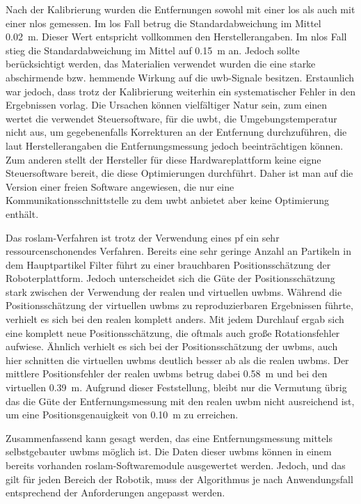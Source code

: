 Nach der Kalibrierung wurden die Entfernungen sowohl mit einer \gls{los} als auch mit einer \gls{nlos} gemessen. Im \gls{los} Fall betrug die Standardabweichung im Mittel \SI{0.02}{\meter}. Dieser Wert entspricht vollkommen den Herstellerangaben. Im \gls{nlos} Fall stieg die Standardabweichung im Mittel auf \SI{0.15}{\meter} an. Jedoch sollte berücksichtigt werden, das Materialien verwendet wurden die eine starke abschirmende bzw. hemmende Wirkung auf die \gls{uwb}-Signale besitzen. Erstaunlich war jedoch, dass trotz der Kalibrierung weiterhin ein systematischer Fehler in den Ergebnissen vorlag. Die Ursachen können vielfältiger Natur sein, zum einen wertet die verwendet Steuersoftware, für die \gls{uwbt}, die Umgebungstemperatur nicht aus, um gegebenenfalls Korrekturen an der Entfernung durchzuführen, die laut Herstellerangaben die Entfernungsmessung jedoch beeinträchtigen können. Zum anderen stellt der Hersteller für diese Hardwareplattform keine eigne Steuersoftware bereit, die diese Optimierungen durchführt. Daher ist man auf die Version einer freien Software angewiesen, die nur eine Kommunikationsschnittstelle zu dem \gls{uwbt} anbietet aber keine Optimierung enthält.

Das \gls{roslam}-Verfahren ist trotz der Verwendung eines \gls{pf} ein sehr ressourcenschonendes Verfahren. Bereits eine sehr geringe Anzahl an Partikeln in dem Hauptpartikel Filter führt zu einer brauchbaren Positionsschätzung der Roboterplattform. Jedoch unterscheidet sich die Güte der Positionsschätzung stark zwischen der Verwendung der realen und virtuellen \glspl{uwbm}. Während die Positionsschätzung der virtuellen \glspl{uwbm} zu reproduzierbaren Ergebnissen führte, verhielt es sich bei den realen  komplett anders. Mit jedem Durchlauf ergab sich eine komplett neue Positionsschätzung, die oftmals auch große Rotationsfehler aufwiese. Ähnlich verhielt es sich bei der Positionsschätzung der \glspl{uwbm}, auch hier schnitten die virtuellen \glspl{uwbm} deutlich besser ab als die realen \glspl{uwbm}. Der mittlere Positionsfehler der realen \glspl{uwbm} betrug dabei \SI{0.58}{\meter} und bei den virtuellen \SI{0.39}{\meter}. Aufgrund dieser Feststellung, bleibt nur die Vermutung übrig das die Güte der Entfernungsmessung mit den realen \gls{uwbm} nicht ausreichend ist, um eine Positionsgenauigkeit von \SI{0.10}{\meter} zu erreichen.

Zusammenfassend kann gesagt werden, das eine Entfernungsmessung mittels selbstgebauter \glspl{uwbm} möglich ist. Die Daten dieser \glspl{uwbm} können in einem bereits vorhanden \gls{roslam}-Softwaremodule ausgewertet werden. Jedoch, und das gilt für jeden Bereich der Robotik, muss der Algorithmus je nach Anwendungsfall entsprechend der Anforderungen angepasst werden.







